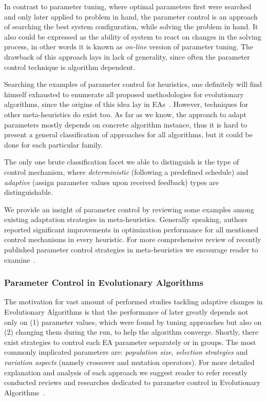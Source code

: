 In contrast to parameter tuning, where optimal parameters first were searched and only later applied to problem in hand, the parameter control is an approach of searching the best system configuration, while solving the problem in hand. It also could be expressed as the ability of system to react on changes in the solving process, in other words it is known as \textit{on-line} version of parameter tuning. The drawback of this approach lays in lack of generality, since  often the parameter control technique is algorithm dependent.

Searching the examples of parameter control for heuristics, one definitely will find himself exhausted to enumerate all proposed methodologies for evolutionary algorithms, since the origins of this idea lay in EAs~\cite{karafotias2014parameter}. However, techniques for other meta-heuristics do exist too.
As far as we know, the approach to adapt parameters mostly depends on concrete algorithm instance, thus it is hard to present a general classification of approaches for all algorithms, but it could be done for each particular family.

The only one brute classification facet we able to distinguish is the type of control mechanism, where \textit{deterministic} (following a predefined schedule) and \textit{adaptive} (assign parameter values upon received feedback) types are distinguishable.

We provide an insight of parameter control by reviewing some examples among existing adaptation strategies in meta-heuristics.
Generally speaking, authors reported significant improvements in optimization performance for all mentioned control mechanisms in every heuristic. For more comprehensive review of recently published parameter control strategies in meta-heuristics we encourage reader to examine~\cite{huang2019survey}.

\subsubsection{Parameter Control in Evolutionary Algorithms} 
The motivation for vast amount of performed studies tackling adaptive changes in Evolutionary Algorithms is that the performance of later greatly depends not only on (1) parameter values, which were found by tuning approaches but also on (2) changing them during the run, to help the algorithm converge.
Shortly, there exist strategies to control each EA parameter separately or in groups. The most commonly implicated parameters are: \textit{population size}, \textit{selection strategies} and \textit{variation aspects} (namely crossover and mutation operators). For more detailed explanation and analysis of each approach we suggest reader to refer recently conducted reviews and researches dedicated to parameter control in Evolutionary Algorithms~\cite{karafotias2014parameter,aleti2016systematic,smith2020self}.

